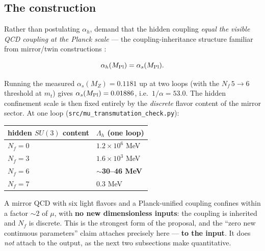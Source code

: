 \documentclass[preprint,12pt]{elsarticle}
\begin{document}
\subsection{The construction}\label{sec-3-1}

Rather than postulating \(\alpha_h\), demand that the hidden coupling
\emph{equal the visible QCD coupling at the Planck scale} --- the
coupling-inheritance structure familiar from mirror/twin constructions
\citep{Chacko:2005pe}:

\begin{equation}\alpha_h(M_{\rm Pl}) = \alpha_s(M_{\rm Pl}).\end{equation}

Running the measured \(\alpha_s(M_Z) = 0.1181\) up at two loops (with
the \(N_f\,5\to6\) threshold at \(m_t\)) gives
\(\alpha_s(M_{\rm Pl}) = 0.01886\), i.e.~\(1/\alpha = 53.0\). The hidden
confinement scale is then fixed entirely by the \emph{discrete} flavor
content of the mirror sector. At one loop
(\texttt{src/\allowbreak mu\_\allowbreak transmutation\_\allowbreak check.\allowbreak py}):

\begin{longtable}[]{@{}
  >{\raggedright\arraybackslash}p{}
  >{\raggedright\arraybackslash}p{}@{}}
\toprule\noalign{}
\begin{minipage}[b]{\linewidth}\raggedright
hidden \(SU(3)\) content
\end{minipage} & \begin{minipage}[b]{\linewidth}\raggedright
\(\Lambda_h\) (one loop)
\end{minipage} \\
\midrule\noalign{}
\endhead
\bottomrule\noalign{}
\endlastfoot
\(N_f = 0\) & \(1.2\times10^{6}\) MeV \\
\(N_f = 3\) & \(1.6\times10^{3}\) MeV \\
\textbf{\(N_f = 6\)} & \textbf{\(\sim\)30--46 MeV} \\
\(N_f = 7\) & \(0.3\) MeV \\
\end{longtable}

A mirror QCD with six light flavors and a Planck-unified coupling
confines within a factor \(\sim 2\) of \(\mu\), with \textbf{no new
dimensionless inputs}: the coupling is inherited and \(N_f\) is
discrete. This is the strongest form of the proposal, and the ``zero new
continuous parameters'' claim attaches precisely here --- \textbf{to the
input}. It does \emph{not} attach to the output, as the next two
subsections make quantitative.
\end{document}
